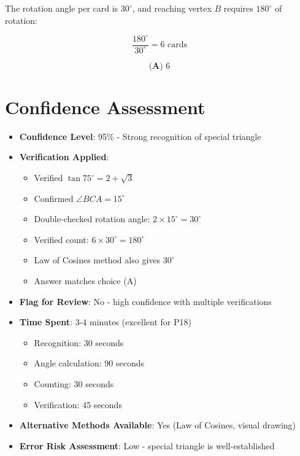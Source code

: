 \documentclass[12pt]{article}
\begin{document}
The rotation angle per card is $30^\circ$, and reaching vertex $B$ requires $180^\circ$ of rotation:

$$\frac{180^\circ}{30^\circ} = 6 \text{ cards}$$

$$\boxed{\textbf{(A) } 6}$$

\section*{Confidence Assessment}

\begin{itemize}[leftmargin=*]
    \item \textbf{Confidence Level}: 95\% - Strong recognition of special triangle
    
    \item \textbf{Verification Applied}: 
    \begin{itemize}
        \item Verified $\tan 75^\circ = 2+\sqrt{3}$ \checkmark
        \item Confirmed $\angle BCA = 15^\circ$ \checkmark
        \item Double-checked rotation angle: $2 \times 15^\circ = 30^\circ$ \checkmark
        \item Verified count: $6 \times 30^\circ = 180^\circ$ \checkmark
        \item Law of Cosines method also gives $30^\circ$ \checkmark
        \item Answer matches choice (A) \checkmark
    \end{itemize}
    
    \item \textbf{Flag for Review}: No - high confidence with multiple verifications
    
    \item \textbf{Time Spent}: 3-4 minutes (excellent for P18)
    \begin{itemize}
        \item Recognition: 30 seconds
        \item Angle calculation: 90 seconds
        \item Counting: 30 seconds
        \item Verification: 45 seconds
    \end{itemize}
    
    \item \textbf{Alternative Methods Available}: Yes (Law of Cosines, visual drawing)
    
    \item \textbf{Error Risk Assessment}: Low - special triangle is well-established
\end{itemize}
\end{document}
